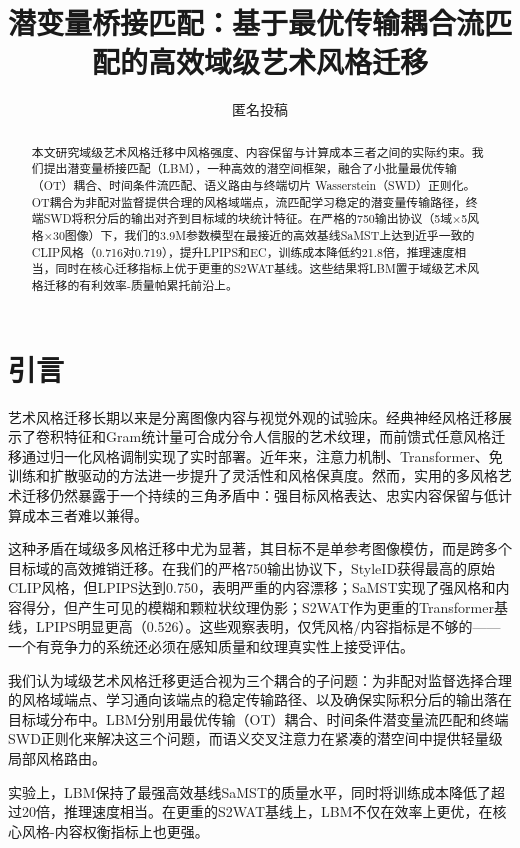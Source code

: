 ﻿\documentclass[letterpaper]{article}
\title{潜变量桥接匹配：基于最优传输耦合流匹配的高效域级艺术风格迁移}
\author{匿名投稿}
\begin{document}
\maketitle

\begin{abstract}
本文研究域级艺术风格迁移中风格强度、内容保留与计算成本三者之间的实际约束。我们提出潜变量桥接匹配（LBM），一种高效的潜空间框架，融合了小批量最优传输（OT）耦合、时间条件流匹配、语义路由与终端切片 Wasserstein（SWD）正则化。OT耦合为非配对监督提供合理的风格域端点，流匹配学习稳定的潜变量传输路径，终端SWD将积分后的输出对齐到目标域的块统计特征。在严格的750输出协议（5域×5风格×30图像）下，我们的3.9M参数模型在最接近的高效基线SaMST上达到近乎一致的CLIP风格（0.716对0.719），提升LPIPS和EC，训练成本降低约21.8倍，推理速度相当，同时在核心迁移指标上优于更重的S2WAT基线。这些结果将LBM置于域级艺术风格迁移的有利效率-质量帕累托前沿上。
\end{abstract}

\section{引言}
艺术风格迁移长期以来是分离图像内容与视觉外观的试验床。经典神经风格迁移展示了卷积特征和Gram统计量可合成分令人信服的艺术纹理\cite{gatys2016image}，而前馈式任意风格迁移通过归一化风格调制实现了实时部署\cite{huang2017adain}。近年来，注意力机制、Transformer、免训练和扩散驱动的方法进一步提升了灵活性和风格保真度\cite{park2019sanet,deng2022stytr2,hong2023aespa,huang2024aesfa,gim2024cast,chung2024styleid}。然而，实用的多风格艺术迁移仍然暴露于一个持续的三角矛盾中：强目标风格表达、忠实内容保留与低计算成本三者难以兼得。

这种矛盾在域级多风格迁移中尤为显著，其目标不是单参考图像模仿，而是跨多个目标域的高效摊销迁移。在我们的严格750输出协议下，StyleID获得最高的原始CLIP风格，但LPIPS达到0.750，表明严重的内容漂移；SaMST实现了强风格和内容得分，但产生可见的模糊和颗粒状纹理伪影；S2WAT作为更重的Transformer基线，LPIPS明显更高（0.526）。这些观察表明，仅凭风格/内容指标是不够的——一个有竞争力的系统还必须在感知质量和纹理真实性上接受评估。

我们认为域级艺术风格迁移更适合视为三个耦合的子问题：为非配对监督选择合理的风格域端点、学习通向该端点的稳定传输路径、以及确保实际积分后的输出落在目标域分布中。LBM分别用最优传输（OT）耦合、时间条件潜变量流匹配和终端SWD正则化来解决这三个问题，而语义交叉注意力在紧凑的潜空间中提供轻量级局部风格路由。

实验上，LBM保持了最强高效基线SaMST的质量水平，同时将训练成本降低了超过20倍，推理速度相当。在更重的S2WAT基线上，LBM不仅在效率上更优，在核心风格-内容权衡指标上也更强。
\end{document}
